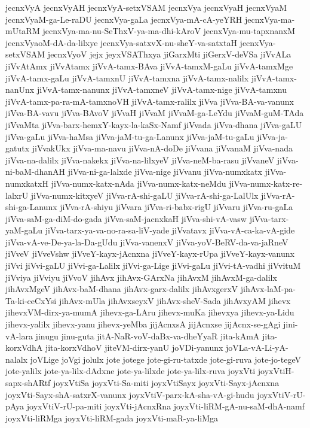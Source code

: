 {jecnxVyA
jecnxVyAH
jecnxVyA-setxVSAM
jecnxVya
jecnxVyaH
jecnxVyaM
jecnxVyaM-ga-Le-raDU
jecnxVya-gaLa
jecnxVya-mA-cA-yeYRH
jecnxVya-ma-mUtaRM
jecnxVya-ma-nu-SeThxV-ya-ma-dhi-kAroV
jecnxVya-mu-tapxnanxM
jecnxVyaoM-dA-da-lilxye
jecnxVya-satxvX-nu-sheY-va-satxtaH
jecnxVya-setxVSAM
jecnxVyoV
jejx
jeyxVSAThxya
jiGarxMti
jiGerxV-deVSa
jiVvALa
jiVvAtAmx
jiVvAtamx
jiVvA-tamx-BAva
jiVvA-tamxM-gaLu
jiVvA-tamxMge
jiVvA-tamx-gaLu
jiVvA-tamxnU
jiVvA-tamxna
jiVvA-tamx-nalilx
jiVvA-tamx-nanUnx
jiVvA-tamx-nanunx
jiVvA-tamxneV
jiVvA-tamx-nige
jiVvA-tamxnu
jiVvA-tamx-pa-ra-mA-tamxnoVH
jiVvA-tamx-ralilx
jiVva
jiVva-BA-va-vanunx
jiVva-BA-vavu
jiVva-BAvoV
jiVvaH
jiVvaM
jiVvaM-ga-LeYdu
jiVvaM-guM-TAda
jiVvaMta
jiVva-barx-hemxY-kayx-la-kaSx-Namf
jiVvada
jiVva-dhana
jiVva-gaLU
jiVva-gaLu
jiVva-haMsa
jiVva-jaM-tu-ga-Lanunx
jiVva-jaM-tu-gaLu
jiVva-ja-gatutx
jiVvakUkx
jiVva-ma-navu
jiVva-nA-doDe
jiVvana
jiVvanaM
jiVva-nada
jiVva-na-dalilx
jiVva-nakekx
jiVva-na-lilxyeV
jiVva-neM-ba-rasu
jiVvaneV
jiVva-ni-baM-dhanAH
jiVva-ni-ga-lalxde
jiVva-nige
jiVvanu
jiVva-numxkatx
jiVva-numxkatxH
jiVva-numx-katx-nAda
jiVva-numx-katx-neMdu
jiVva-numx-katx-re-lalxrU
jiVva-numx-kitxyeV
jiVva-rA-shi-gaLU
jiVva-rA-shi-ga-LalUlx
jiVva-rA-shi-ga-Lanunx
jiVva-rA-shiyu
jiVvara
jiVva-ri-babx-rigU
jiVvaru
jiVva-ru-gaLa
jiVva-saM-ga-diM-do-gada
jiVva-saM-jacnxkaH
jiVva-shi-vA-vasw
jiVva-tarx-yaM-gaLu
jiVva-tarx-ya-va-no-ra-sa-liV-yade
jiVvatavx
jiVva-vA-ca-ka-vA-gide
jiVva-vA-ve-De-ya-la-Da-gUdu
jiVva-vanenxV
jiVva-yoV-BeRV-da-va-jaRneV
jiVveV
jiVveVshw
jiVveY-kayx-jAcnxna
jiVveY-kayx-rUpa
jiVveY-kayx-vanunx
jiVvi
jiVvi-gaLU
jiVvi-ga-Lalilx
jiVvi-ga-Lige
jiVvi-gaLu
jiVvi-tA-vadhi
jiVvituM
jiVviya
jiVviyu
jiVvoV
jihAvx
jihAvx-GArxNa
jihAvxM
jihAvxM-ga-dalilx
jihAvxMgeV
jihAvx-baM-dhana
jihAvx-garx-dalilx
jihAvxgerxV
jihAvx-laM-pa-Ta-ki-ceCxYsi
jihAvx-mUla
jihAvxseyxV
jihAvx-sheV-Sada
jihAvxyAM
jihevx
jihevxVM-dirx-ya-mumA
jihevx-ga-LAru
jihevx-muKa
jihevxya
jihevx-ya-Lidu
jihevx-yalilx
jihevx-yanu
jihevx-yeMba
jijAcnxsA
jijAcnxse
jijAcnx-se-gAgi
jini-vA-lara
jinugu
jinu-guta
jitA-NaR-voV-daBx-va-dheYyaR
jita-kAmA
jita-korxVdhA
jita-korxVdhoV
jiteVM-dirx-yanU
joVDi-yanunx
joVLa-vA-Li-yA-nalalx
joVLige
joVgi
jolulx
jote
jotege
jote-gi-ru-tatxde
jote-gi-ruva
jote-jo-tegeV
jote-yalilx
jote-ya-lilx-dAdxne
jote-ya-lilxde
jote-ya-lilx-ruva
joyxVti
joyxVtiH-sapx-shARtf
joyxVtiSa
joyxVti-Sa-miti
joyxVtiSayx
joyxVti-Sayx-jAcnxna
joyxVti-Sayx-shA-satxrX-vanunx
joyxVtiV-parx-kA-sha-vA-gi-hudu
joyxVtiV-rU-pAya
joyxVtiV-rU-pa-miti
joyxVti-jAcnxRna
joyxVti-liRM-gA-nu-saM-dhA-namf
joyxVti-liRMga
joyxVti-liRM-gada
joyxVti-maR-ya-liMga
}
